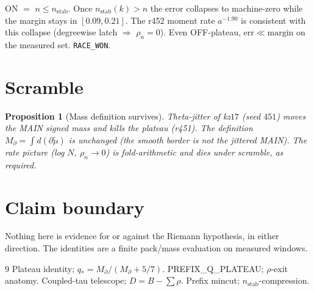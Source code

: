 \documentclass[11pt]{article}
\newtheorem{prop}{Proposition}
\begin{document}
ON $=$ $n\le n_{\mathrm{stab}}$.
Once $n_{\mathrm{stab}}(k)>n$ the error
collapses to machine-zero while the
margin stays in $[0.09,0.21]$.
The r452 moment rate $a^{-1.90}$ is
consistent with this collapse
(degreewise latch $\Rightarrow$ $\rho_n=0$).
Even OFF-plateau, $\mathrm{err}\ll\mathrm{margin}$
on the measured set.
\texttt{RACE\_WON}.

\section{Scramble}\label{sec:scr}

\begin{prop}[Mass definition survives]\label{prop:scr}
Theta-jitter of kz$17$ (seed $451$)
moves the MAIN signed mass and kills
the plateau (r451).
The \emph{definition}
$M_\partial=\int d(\partial\tilde\mu)$
is unchanged (the smooth border is not
the jittered MAIN).
The rate picture (log $N$, $\rho_n\to0$)
is fold-arithmetic and dies under
scramble, as required.
\end{prop}

\section*{Claim boundary}

Nothing here is evidence for or against the
Riemann hypothesis, in either direction.
The identities are a finite pack/mass
evaluation on measured windows.

\begin{thebibliography}{9}
 Plateau identity; $q_*=M_\partial/(M_\partial+5/7)$.
 PREFIX\_Q\_PLATEAU; $\rho$-exit anatomy.
 Coupled-tau telescope; $D=B-\sum\rho$.
 Prefix mincut; $n_{\mathrm{stab}}$-compression.
\end{thebibliography}
\end{document}
